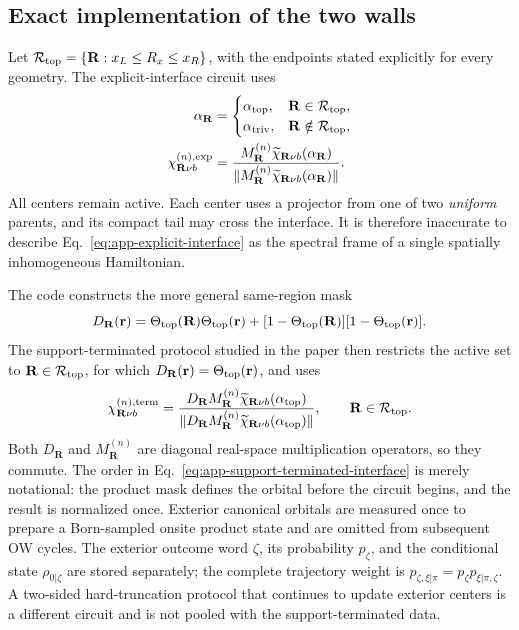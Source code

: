 \subsection{Exact implementation of the two walls}

Let
\(\mathcal R_{\rm top}=\{\mathbf R:x_L\leq R_x\leq x_R\}\), with the
endpoints stated explicitly for every geometry.  The explicit-interface
circuit uses
\begin{align}
    \alpha_{\mathbf R}&=
    \begin{cases}
      \alpha_{\rm top},&\mathbf R\in\mathcal R_{\rm top},\\
      \alpha_{\rm triv},&\mathbf R\notin\mathcal R_{\rm top},
    \end{cases}
    \nonumber\\
    \chi^{(n),{\rm exp}}_{\mathbf R\nu b}
    &=\frac{M_{\mathbf R}^{(n)}\widetilde\chi_{\mathbf R\nu b}
      (\alpha_{\mathbf R})}
    {\|M_{\mathbf R}^{(n)}\widetilde\chi_{\mathbf R\nu b}
      (\alpha_{\mathbf R})\|}.
    \label{eq:app-explicit-interface}
\end{align}
All centers remain active.  Each center uses a projector from one of two
\emph{uniform} parents, and its compact tail may cross the interface.  It is
therefore inaccurate to describe Eq.~\eqref{eq:app-explicit-interface} as
the spectral frame of a single spatially inhomogeneous Hamiltonian.

The code constructs the more general same-region mask
\begin{equation}
    D_{\mathbf R}(\mathbf r)
    =\Theta_{\rm top}(\mathbf R)\Theta_{\rm top}(\mathbf r)
    +[1-\Theta_{\rm top}(\mathbf R)]
     [1-\Theta_{\rm top}(\mathbf r)].
    \label{eq:app-same-region-mask}
\end{equation}
The support-terminated protocol studied in the paper then restricts the
active set to \(\mathbf R\in\mathcal R_{\rm top}\), for which
\(D_{\mathbf R}(\mathbf r)=\Theta_{\rm top}(\mathbf r)\), and uses
\begin{equation}
    \chi^{(n),{\rm term}}_{\mathbf R\nu b}
    =\frac{D_{\mathbf R}M_{\mathbf R}^{(n)}
      \widetilde\chi_{\mathbf R\nu b}(\alpha_{\rm top})}
    {\|D_{\mathbf R}M_{\mathbf R}^{(n)}
      \widetilde\chi_{\mathbf R\nu b}(\alpha_{\rm top})\|},
    \qquad \mathbf R\in\mathcal R_{\rm top}.
    \label{eq:app-support-terminated-interface}
\end{equation}
Both \(D_{\mathbf R}\) and \(M_{\mathbf R}^{(n)}\) are diagonal real-space
multiplication operators, so they commute.  The order in
Eq.~\eqref{eq:app-support-terminated-interface} is merely notational: the
product mask defines the orbital before the circuit begins, and the result is
normalized once.  Exterior canonical orbitals are measured once to prepare a
Born-sampled onsite product state and are omitted from subsequent OW cycles.
The exterior outcome word \(\zeta\), its probability \(p_\zeta\), and the
conditional state \(\rho_{0|\zeta}\) are stored separately; the complete
trajectory weight is
\(p_{\zeta,\xi|\pi}=p_\zeta p_{\xi|\pi,\zeta}\).
A two-sided hard-truncation protocol that continues to update exterior
centers is a different circuit and is not pooled with the support-terminated
data.

